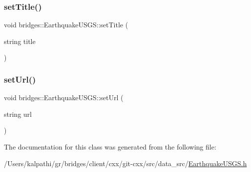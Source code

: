 \subsubsection{\texorpdfstring{set\+Title()}{setTitle()}}
{\footnotesize\ttfamily void bridges\+::\+Earthquake\+U\+S\+G\+S\+::set\+Title (\begin{DoxyParamCaption}\item[{string}]{title }\end{DoxyParamCaption})\hspace{0.3cm}{\ttfamily [inline]}}

\hypertarget{classbridges_1_1_earthquake_u_s_g_s_ac07298c50e03955d167a2ca38c5150be}{}\label{classbridges_1_1_earthquake_u_s_g_s_ac07298c50e03955d167a2ca38c5150be} 
\subsubsection{\texorpdfstring{set\+Url()}{setUrl()}}
{\footnotesize\ttfamily void bridges\+::\+Earthquake\+U\+S\+G\+S\+::set\+Url (\begin{DoxyParamCaption}\item[{string}]{url }\end{DoxyParamCaption})\hspace{0.3cm}{\ttfamily [inline]}}



The documentation for this class was generated from the following file\+:\begin{DoxyCompactItemize}
\item 
/\+Users/kalpathi/gr/bridges/client/cxx/git-\/cxx/src/data\+\_\+src/\hyperlink{_earthquake_u_s_g_s_8h}{Earthquake\+U\+S\+G\+S.\+h}\end{DoxyCompactItemize}
